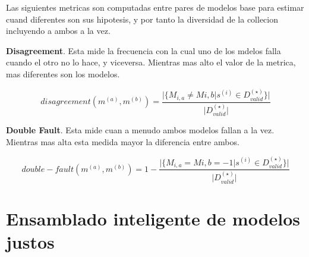 Las siguientes metricas son computadas entre pares de modelos base para estimar cuand diferentes son sus hipotesis, y por tanto la diversidad de la collecion incluyendo a ambos a la vez.

\textbf{Disagreement}. Esta mide la frecuencia con la cual uno de los mdelos falla cuando el otro no lo hace, y viceversa. Mientras mas alto el valor de la metrica, mas diferentes son los modelos.

\begin{equation}
    disagreement(m^{(a)}, m^{(b)}) = \frac{\vert\{M_{i,a} \neq M{i,b} \vert s^{(i)} \in D^{(\star)}_{valid}\}\vert}{\vert D^{(\star)}_{valid} \vert}
\end{equation}

\textbf{Double Fault}. Esta mide cuan a menudo ambos modelos fallan a la vez. Mientras mas alta esta medida mayor la diferencia entre ambos.

\begin{equation}
    double-fault(m^{(a)}, m^{(b)}) = 1 - \frac{\vert\{M_{i,a} = M{i,b} = -1 \vert s^{(i)} \in D^{(\star)}_{valid}\}\vert}{\vert D^{(\star)}_{valid} \vert}
\end{equation}

\section{Ensamblado inteligente de modelos justos}\label{section:second-phase}



